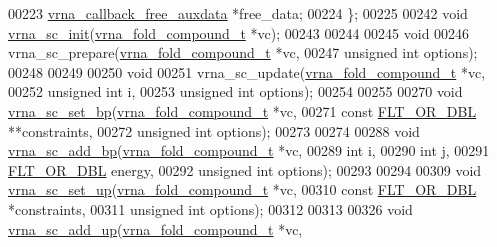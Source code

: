 \begin{DoxyCode}
00223   \hyperlink{group__fold__compound_ga7806651f51b195013839a218b3bbd5a3}{vrna\_callback\_free\_auxdata}  *free\_data;
00224 \};
00225 
00242 \textcolor{keywordtype}{void} \hyperlink{group__soft__constraints_ga9d977a1681356778cc66dceafbe5b032}{vrna\_sc\_init}(\hyperlink{group__fold__compound_structvrna__fc__s}{vrna\_fold\_compound\_t} *vc);
00243 
00244 
00245 \textcolor{keywordtype}{void}
00246 vrna\_sc\_prepare(\hyperlink{group__fold__compound_structvrna__fc__s}{vrna\_fold\_compound\_t}  *vc,
00247                 \textcolor{keywordtype}{unsigned} \textcolor{keywordtype}{int}          options);
00248 
00249 
00250 \textcolor{keywordtype}{void}
00251 vrna\_sc\_update(\hyperlink{group__fold__compound_structvrna__fc__s}{vrna\_fold\_compound\_t} *vc,
00252                \textcolor{keywordtype}{unsigned} \textcolor{keywordtype}{int}         i,
00253                \textcolor{keywordtype}{unsigned} \textcolor{keywordtype}{int}         options);
00254 
00255 
00270 \textcolor{keywordtype}{void} \hyperlink{group__soft__constraints_ga8e4334b24bc91453fbcda490a4e331af}{vrna\_sc\_set\_bp}(\hyperlink{group__fold__compound_structvrna__fc__s}{vrna\_fold\_compound\_t}  *vc,
00271                     \textcolor{keyword}{const} \hyperlink{group__data__structures_ga31125aeace516926bf7f251f759b6126}{FLT\_OR\_DBL}      **constraints,
00272                     \textcolor{keywordtype}{unsigned} \textcolor{keywordtype}{int}          options);
00273 
00274 
00288 \textcolor{keywordtype}{void} \hyperlink{group__soft__constraints_gaf162aedac7422f2eb16ea030f47d2f4b}{vrna\_sc\_add\_bp}(\hyperlink{group__fold__compound_structvrna__fc__s}{vrna\_fold\_compound\_t}  *vc,
00289                     \textcolor{keywordtype}{int}                   i,
00290                     \textcolor{keywordtype}{int}                   j,
00291                     \hyperlink{group__data__structures_ga31125aeace516926bf7f251f759b6126}{FLT\_OR\_DBL}            energy,
00292                     \textcolor{keywordtype}{unsigned} \textcolor{keywordtype}{int}          options);
00293 
00294 
00309 \textcolor{keywordtype}{void} \hyperlink{group__soft__constraints_ga99ed63f3ef9e7fe3997932030487a344}{vrna\_sc\_set\_up}(\hyperlink{group__fold__compound_structvrna__fc__s}{vrna\_fold\_compound\_t}  *vc,
00310                     \textcolor{keyword}{const} \hyperlink{group__data__structures_ga31125aeace516926bf7f251f759b6126}{FLT\_OR\_DBL}      *constraints,
00311                     \textcolor{keywordtype}{unsigned} \textcolor{keywordtype}{int}          options);
00312 
00313 
00326 \textcolor{keywordtype}{void} \hyperlink{group__soft__constraints_ga069915fe203a2c8e522dd37847177a09}{vrna\_sc\_add\_up}(\hyperlink{group__fold__compound_structvrna__fc__s}{vrna\_fold\_compound\_t}  *vc,

\end{DoxyCode}
